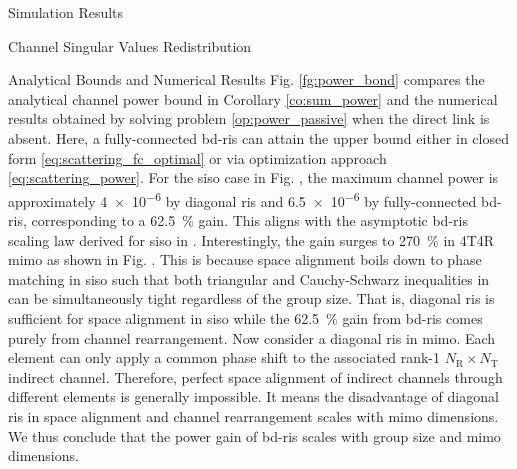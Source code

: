 \documentclass[journal]{IEEEtran}
\begin{document}
\begin{section}{Simulation Results}
\begin{subsection}{Channel Singular Values Redistribution}
\begin{subsubsection}{Analytical Bounds and Numerical Results}
			Fig. \ref{fg:power_bond} compares the analytical channel power bound in Corollary \ref{co:sum_power} and the numerical results obtained by solving problem \eqref{op:power_passive} when the direct link is absent.
			Here, a fully-connected \gls{bd}-\gls{ris} can attain the upper bound either in closed form \eqref{eq:scattering_fc_optimal} or via optimization approach \eqref{eq:scattering_power}.
			For the \gls{siso} case in Fig. , the maximum channel power is approximately \num{4e-6} by diagonal \gls{ris} and \num{6.5e-6} by fully-connected \gls{bd}-\gls{ris}, corresponding to a \qty{62.5}{\percent} gain.
			This aligns with the asymptotic \gls{bd}-\gls{ris} scaling law derived for \gls{siso} in \cite{Shen2020a}.
			Interestingly, the gain surges to \qty{270}{\percent} in 4T4R \gls{mimo} as shown in Fig. .
			This is because space alignment boils down to phase matching in \gls{siso} such that both triangular and Cauchy-Schwarz inequalities in \cite[(50)]{Shen2020a} can be simultaneously tight regardless of the group size.
			That is, diagonal \gls{ris} is sufficient for space alignment in \gls{siso} while the \qty{62.5}{\percent} gain from \gls{bd}-\gls{ris} comes purely from channel rearrangement.
			Now consider a diagonal \gls{ris} in \gls{mimo}.
			Each element can only apply a common phase shift to the associated rank-1 $N_\mathrm{R} \times N_\mathrm{T}$ indirect channel.
			Therefore, perfect space alignment of indirect channels through different elements is generally impossible.
			It means the disadvantage of diagonal \gls{ris} in space alignment and channel rearrangement scales with \gls{mimo} dimensions.
			We thus conclude that the power gain of \gls{bd}-\gls{ris} scales with group size and \gls{mimo} dimensions.
		\end{subsubsection}


\end{subsection}
\end{section}
\end{document}
